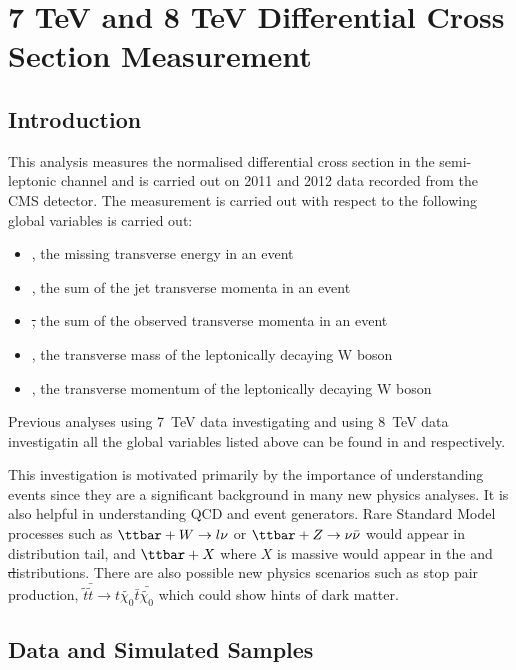 \chapter{7 TeV and 8 TeV Differential Cross Section Measurement}
\label{c:Differential_Cross_Section}

\section{Introduction}
\label{s:xsections_introduction}
This analysis measures the normalised differential \ttbar cross section in the semi-leptonic channel and is
carried out on 2011 and 2012 data recorded from the CMS detector. The measurement is carried out with respect
to the following global variables is carried out:
\begin {itemize}
  \item {\met, the missing transverse energy in an event}
  \item {\HT, the sum of the jet transverse momenta in an event}
  \item {\st, the sum of the observed transverse momenta in an event}
  \item {\mt, the transverse mass of the leptonically decaying W boson}
  \item {\wpt, the transverse momentum of the leptonically decaying W boson}
\end{itemize}

Previous analyses using 7~TeV data investigating \met and using 8~TeV data investigatin all the global
variables listed above can be found in \cite{CMS-PAS-TOP-12-019} and \cite{CMS-PAS-TOP-12-042} respectively.

This investigation is motivated primarily by the importance of understanding \ttbar events since they are a
significant background in many new physics analyses. It is also helpful in understanding QCD and event
generators. Rare Standard Model processes such as $\ttbar + W\rightarrow l\nu$ or $\ttbar + Z\rightarrow
\nu\bar{\nu}$ would appear in \met distribution tail, and $\ttbar + X$ where $X$ is massive would appear in
the \HT and \st distributions. There are also possible new physics scenarios such as stop pair production,
$\tilde{t}\bar{\tilde{t}} \rightarrow t\tilde{\chi_0} \bar{t}\bar{\tilde{\chi_0}}$ which could show
hints of dark matter.

\section{Data and Simulated Samples}
\label{s:data_and_simulated_samples}

